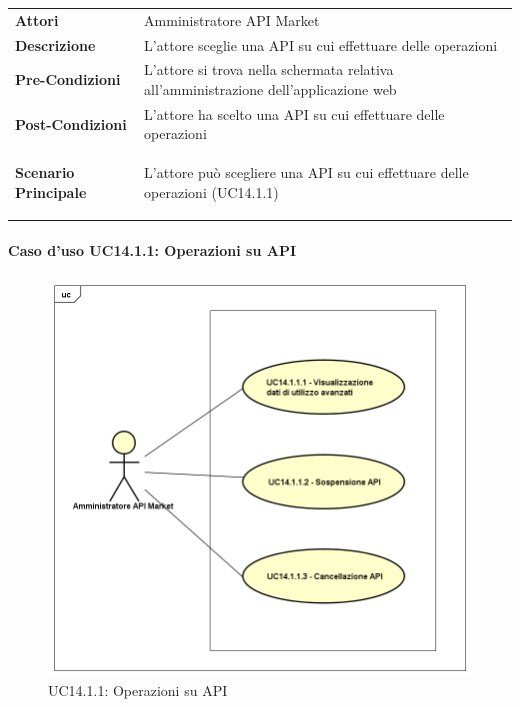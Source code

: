 \begin{minipage}{\linewidth}
	\begin{tabular}{ l | p{11cm}}
		\hline
		\rowcolor{Gray}
		\multicolumn{2}{c}{UC14.1 - Scelta API} \\
		\hline
		\textbf{Attori} & Amministratore API Market \\
		\textbf{Descrizione} & L'attore sceglie una API su cui effettuare delle operazioni \\
		\textbf{Pre-Condizioni} & L'attore si trova nella schermata relativa all'amministrazione dell'applicazione web \\
		\textbf{Post-Condizioni} & L'attore ha scelto una API su cui effettuare delle operazioni \\
		\textbf{Scenario Principale} & 
		\begin{enumerate*}[label=(\arabic*.),itemjoin={\newline}]
			\item L'attore può scegliere una API su cui effettuare delle operazioni (UC14.1.1)
		\end{enumerate*}\\
	\end{tabular}
\end{minipage}

\newpage
\paragraph{Caso d'uso UC14.1.1: Operazioni su API}
\label{UC14_1_1}
\begin{figure}[ht]
	\centering
	\includegraphics[scale=0.45]{UML/UC14_1_1.png}
	\caption{UC14.1.1: Operazioni su API}
\end{figure}

